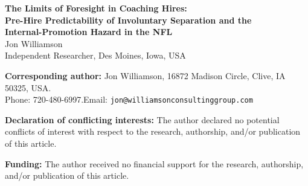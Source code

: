 \documentclass[12pt,USenglish]{article}
\begin{document}
\begin{center}
{\large\bfseries The Limits of Foresight in Coaching Hires:\\
Pre-Hire Predictability of Involuntary Separation and the\\
Internal-Promotion Hazard in the NFL}\\[18pt]
Jon Williamson\\[2pt]
\normalsize Independent Researcher, Des Moines, Iowa, USA
\end{center}

\vfill

\noindent\textbf{Corresponding author:} Jon Williamson, 16872 Madison Circle, Clive, IA 50325, USA.\\
Phone: 720-480-6997.\quad Email: \texttt{jon@williamsonconsultinggroup.com}

\medskip
\noindent\textbf{Declaration of conflicting interests:} The author declared no potential conflicts of interest with respect to the research, authorship, and/or publication of this article.

\medskip
\noindent\textbf{Funding:} The author received no financial support for the research, authorship, and/or publication of this article.
\end{document}
